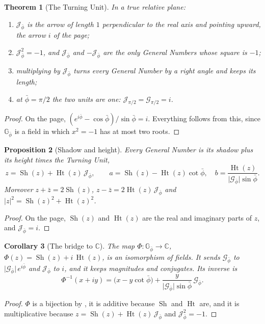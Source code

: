 \documentclass[11pt,a4paper]{amsart}
\theoremstyle{plain}
\newtheorem{theorem}{Theorem}[section]
\newtheorem{proposition}[theorem]{Proposition}
\newtheorem{corollary}[theorem]{Corollary}
\theoremstyle{definition}
\theoremstyle{remark}
\newcommand{\pb}{\bar{\phi}}                     %
\newcommand{\Gp}{\mathcal{G}_{\bar{\phi}}}       %
\newcommand{\Jp}{\mathcal{J}_{\bar{\phi}}}       %
\newcommand{\GNp}{\mathbb{G}_{\bar{\phi}}}       %
\newcommand{\C}{\mathbb{C}}
\DeclareMathOperator{\Sh}{Sh}                    %
\DeclareMathOperator{\Ht}{Ht}                    %
\begin{document}
\begin{theorem}[The Turning Unit]\label{thm:turning-unit}
In a true relative plane:
\begin{enumerate}
  \item $\Jp$ is the arrow of length $1$ perpendicular to the real axis and pointing upward, the arrow $i$ of the page;
  \item $\Jp^2 = -1$, and $\Jp$ and $-\Jp$ are the only General Numbers whose square is $-1$;
  \item multiplying by $\Jp$ turns every General Number by a right angle and keeps its length;
  \item at $\pb = \pi/2$ the two units are one: $\mathcal{J}_{\pi/2} = \mathcal{G}_{\pi/2} = i$.
\end{enumerate}
\end{theorem}

\begin{proof}
On the page, $(e^{i\pb} - \cos\pb)/\sin\pb = i$. Everything follows from this, since $\GNp$ is a field in which $x^2 = -1$ has at most two roots.
\end{proof}

\begin{proposition}[Shadow and height]\label{prop:shadow-height}
Every General Number is its shadow plus its height times the Turning Unit,
\[
z = \Sh(z) + \Ht(z)\,\Jp , \qquad a = \Sh(z) - \Ht(z)\cot\pb , \quad b = \frac{\Ht(z)}{\lvert\Gp\rvert\sin\pb} .
\]
Moreover $z + \bar{z} = 2\Sh(z)$, $z - \bar{z} = 2\Ht(z)\,\Jp$ and $\lvert z\rvert^2 = \Sh(z)^2 + \Ht(z)^2$.
\end{proposition}

\begin{proof}
On the page, $\Sh(z)$ and $\Ht(z)$ are the real and imaginary parts of $z$, and $\Jp = i$.
\end{proof}

\begin{corollary}[The bridge to $\C$]\label{cor:bridge}
The map $\Phi \colon \GNp \to \C$, $\Phi(z) = \Sh(z) + i\,\Ht(z)$, is an isomorphism of fields. It sends $\Gp$ to $\lvert\Gp\rvert\,e^{i\pb}$ and $\Jp$ to $i$, and it keeps magnitudes and conjugates. Its inverse is
\[
\Phi^{-1}(x + iy) = \bigl(x - y\cot\pb\bigr) + \frac{y}{\lvert\Gp\rvert\sin\pb}\,\Gp .
\]
\end{corollary}

\begin{proof}
$\Phi$ is a bijection by , it is additive because $\Sh$ and $\Ht$ are, and it is multiplicative because $z = \Sh(z) + \Ht(z)\,\Jp$ and $\Jp^2 = -1$.
\end{proof}
\end{document}
